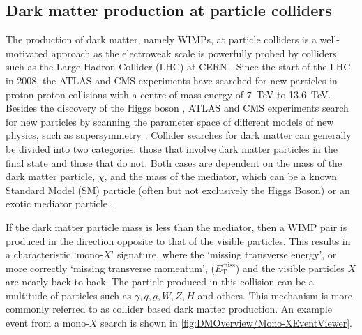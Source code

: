 \subsection{Dark matter production at particle colliders}\label{sec:DMOverview/DMProdColliders}
The production of dark matter, namely WIMPs, at particle colliders is a well-motivated approach as the electroweak scale is powerfully probed by colliders such as the Large Hadron Collider (LHC) at CERN \cite{Evans:2008zzb}. Since the start of the LHC in 2008, the ATLAS \cite{ATLAS:2008xda} and CMS \cite{CMS:2008xjf} experiments have searched for new particles in proton-proton collisions with a centre-of-mass-energy of 7~TeV to 13.6~TeV. Besides the discovery of the Higgs boson \cite{ATLAS:2012yve,CMS:2012qbp}, ATLAS and CMS experiments search for new particles by scanning the parameter space of different models of new physics, such as supersymmetry \cite{hteagle:thesis}.
Collider searches for dark matter can generally be divided into two categories: those that involve dark matter particles in the final state and those that do not. Both cases are dependent on the mass of the dark matter particle, $\chi$, and the mass of the mediator, which can be a known Standard Model (SM) particle (often but not exclusively the Higgs Boson) or an exotic mediator particle \cite{Penning:2017tmb}. 

If the dark matter particle mass is less than the mediator, then a WIMP pair is produced in the direction opposite to that of the visible particles. This results in a characteristic `mono-$X$' signature, where the `missing transverse energy', or more correctly `missing transverse momentum', ($E^{\text{miss}}_\text{T}$) and the visible particles $X$ are nearly back-to-back. The particle produced in this collision can be a multitude of particles such as $\gamma, q, g, W, Z, H$ and others. This mechanism is more commonly referred to as collider based dark matter production. An example event from a mono-$X$ search is shown in \autoref{fig:DMOverview/Mono-XEventViewer}.

